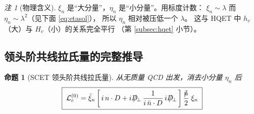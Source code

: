 \documentclass[UTF8,a4paper,11pt]{ctexart}
\theoremstyle{definition}
\theoremstyle{remark}
\newtheorem{remark}{注}[section]
\theoremstyle{plain}
\newtheorem{proposition}{命题}[section]
\newcommand{\nbsl}{\bar{n}\mkern-10.5mu/\mkern1.5mu}
\newcommand{\Dsl}{D\mkern-11.5mu/}
\begin{document}
\begin{remark}[物理含义]
$\xi_n$ 是“大分量”，$\eta_n$ 是“小分量”。用标度计数：
$\xi_n\sim\lambda$ 而 $\eta_n\sim\lambda^2$（见下面 \eqref{eq:etasol}），
所以 $\eta_n$ 相对被压低一个 $\lambda$。
这与 HQET 中 $h_v$（大）与 $H_v$（小）的关系完全平行
（第 \ref{subsec:hqet} 小节）。
\end{remark}

\subsection{领头阶共线拉氏量的完整推导}
\label{subsec:derivL}

\begin{proposition}[SCET 领头阶共线拉氏量]
从无质量 QCD 出发，消去小分量 $\eta_n$ 后
\begin{equation}
  \boxed{\;
  \mathcal L_c^{(0)}
  =\bar\xi_n\left[\,i\,n\cdot D
  +i\Dsl_\perp\,\frac{1}{i\,\bar n\cdot D}\,i\Dsl_\perp\,\right]
  \frac{\nbsl}{2}\;\xi_n \;}
  \label{eq:LSCET}
\end{equation}
\end{proposition}
\end{document}
